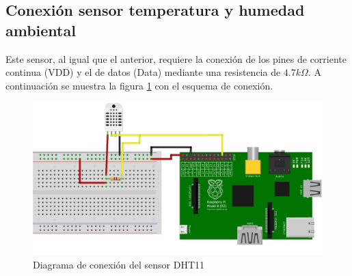     \subsection{Conexión sensor temperatura y humedad ambiental}
        \par Este sensor, al igual que el anterior, requiere la conexión de los pines de corriente continua (VDD) y el de datos (Data) mediante una resistencia de $4.7k\Omega$. A continuación se muestra la figura \ref{fig:EsquemaDHT11} con el esquema de conexión.
        
        \begin{figure}[h]
            \centering
            \includegraphics[scale = 0.8]{DiagramaSensorDHT11_bb.jpg}
            \caption{Diagrama de conexión del sensor DHT11}
            \label{fig:EsquemaDHT11}
        \end{figure}

